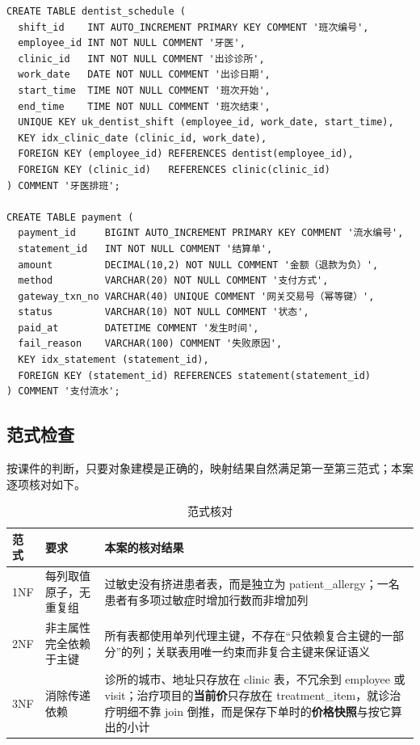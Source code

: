\documentclass[11pt,a4paper]{ctexart}
\begin{document}
\begin{lstlisting}[style=sql]
CREATE TABLE dentist_schedule (
  shift_id    INT AUTO_INCREMENT PRIMARY KEY COMMENT '班次编号',
  employee_id INT NOT NULL COMMENT '牙医',
  clinic_id   INT NOT NULL COMMENT '出诊诊所',
  work_date   DATE NOT NULL COMMENT '出诊日期',
  start_time  TIME NOT NULL COMMENT '班次开始',
  end_time    TIME NOT NULL COMMENT '班次结束',
  UNIQUE KEY uk_dentist_shift (employee_id, work_date, start_time),
  KEY idx_clinic_date (clinic_id, work_date),
  FOREIGN KEY (employee_id) REFERENCES dentist(employee_id),
  FOREIGN KEY (clinic_id)   REFERENCES clinic(clinic_id)
) COMMENT '牙医排班';

CREATE TABLE payment (
  payment_id     BIGINT AUTO_INCREMENT PRIMARY KEY COMMENT '流水编号',
  statement_id   INT NOT NULL COMMENT '结算单',
  amount         DECIMAL(10,2) NOT NULL COMMENT '金额（退款为负）',
  method         VARCHAR(20) NOT NULL COMMENT '支付方式',
  gateway_txn_no VARCHAR(40) UNIQUE COMMENT '网关交易号（幂等键）',
  status         VARCHAR(10) NOT NULL COMMENT '状态',
  paid_at        DATETIME COMMENT '发生时间',
  fail_reason    VARCHAR(100) COMMENT '失败原因',
  KEY idx_statement (statement_id),
  FOREIGN KEY (statement_id) REFERENCES statement(statement_id)
) COMMENT '支付流水';
\end{lstlisting}

\subsection{范式检查}

按课件的判断，只要对象建模是正确的，映射结果自然满足第一至第三范式；本案逐项核对如下。

\begin{table}[H]
\centering
\caption{范式核对}
{\small
\begin{tabularx}{\linewidth}{@{}L{1.9cm}L{5.6cm}X@{}}
\toprule
\textbf{\textcolor{adcblue!92}{范式}} & \textbf{\textcolor{adcblue!92}{要求}} & \textbf{\textcolor{adcblue!92}{本案的核对结果}} \\
\midrule
1NF & 每列取值原子，无重复组 & 过敏史没有挤进患者表，而是独立为 patient\_allergy；一名患者有多项过敏症时增加行数而非增加列 \\
2NF & 非主属性完全依赖于主键 & 所有表都使用单列代理主键，不存在“只依赖复合主键的一部分”的列；关联表用唯一约束而非复合主键来保证语义 \\
3NF & 消除传递依赖 & 诊所的城市、地址只存放在 clinic 表，不冗余到 employee 或 visit；治疗项目的\textbf{当前价}只存放在 treatment\_item，就诊治疗明细不靠 join 倒推，而是保存下单时的\textbf{价格快照}与按它算出的小计 \\
\bottomrule
\end{tabularx}
}
\end{table}
\end{document}
